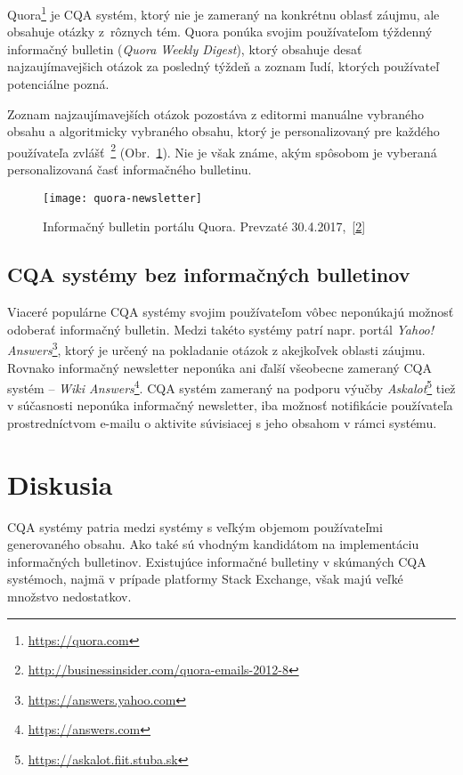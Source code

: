 Quora\footnote{\url{https://quora.com}} je CQA systém, ktorý nie je zameraný na konkrétnu oblasť záujmu, ale obsahuje
otázky z~rôznych tém. Quora ponúka svojim používateľom týždenný informačný bulletin (\emph{Quora Weekly Digest}),
ktorý obsahuje desať najzaujímavejšich otázok za posledný týždeň a zoznam ľudí, ktorých používateľ potenciálne pozná.

Zoznam najzaujímavejších otázok pozostáva z editormi manuálne vybraného obsahu a algoritmicky vybraného obsahu,
ktorý je personalizovaný pre každého používateľa zvlášť~\footnote{\url{http://businessinsider.com/quora-emails-2012-8}\label{fnote-bi}} (Obr.~\ref{fig:quora-newsletter}).
Nie je však známe, akým spôsobom je vyberaná personalizovaná časť informačného bulletinu.

\begin{figure}[H]\begin{center}
\texttt{[image: quora-newsletter]}
\caption{Informačný bulletin portálu Quora. Prevzaté 30.4.2017,~[\ref{fnote-bi}] \label{fig:quora-newsletter}}\end{center}
\end{figure}

\subsection{CQA systémy bez informačných bulletinov}

Viaceré populárne CQA systémy svojim používateľom vôbec neponúkajú možnosť odoberať informačný bulletin. Medzi takéto
systémy patrí napr. portál \emph{Yahoo! Answers}\footnote{\url{https://answers.yahoo.com}}, ktorý je určený na pokladanie
otázok z akejkoľvek oblasti záujmu. Rovnako informačný newsletter neponúka ani ďalší všeobecne zameraný CQA systém --
\emph{Wiki Answers}\footnote{\url{https://answers.com}}. CQA systém zameraný na podporu výučby
\emph{Askalot}\footnote{\url{https://askalot.fiit.stuba.sk}} tiež v súčasnosti neponúka informačný newsletter,
iba možnosť notifikácie používateľa prostredníctvom e-mailu o aktivite súvisiacej s jeho obsahom v rámci systému.


\section{Diskusia}

CQA systémy patria medzi systémy s veľkým objemom používateľmi generovaného obsahu. Ako také sú vhodným kandidátom na
implementáciu informačných bulletinov. Existujúce informačné bulletiny v skúmaných CQA systémoch, najmä v prípade
platformy Stack Exchange, však majú veľké množstvo nedostatkov.

